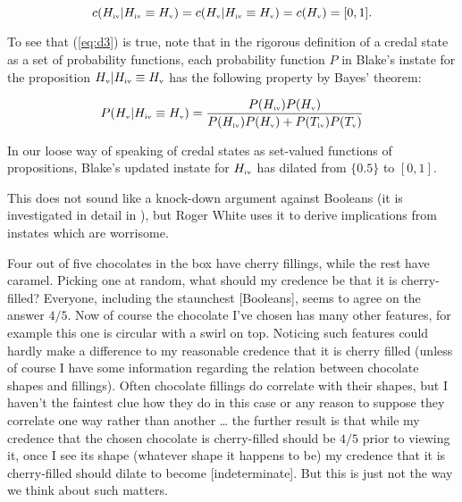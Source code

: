 \documentclass[11pt]{article}
\begin{document}
\begin{equation}
  \label{eq:d3}
  c(H_{\mbox{\tiny{iv}}}|H_{\mbox{\tiny{iv}}}\equiv{}H_{\mbox{\tiny{v}}})=c(H_{\mbox{\tiny{v}}}|H_{\mbox{\tiny{iv}}}\equiv{}H_{\mbox{\tiny{v}}})=c(H_{\mbox{\tiny{v}}})=[0,1].
\end{equation}

To see that (\ref{eq:d3}) is true, note that in the rigorous
definition of a credal state as a set of probability functions, each
probability function $P$ in Blake's instate for the proposition
$H_{\mbox{\tiny{v}}}|H_{\mbox{\tiny{iv}}}\equiv{}H_{\mbox{\tiny{v}}}$
has the following property by Bayes' theorem:

\begin{equation}
  \label{eq:zeibaefu}
  P(H_{\mbox{\tiny{v}}}|H_{\mbox{\tiny{iv}}}\equiv{}H_{\mbox{\tiny{v}}})=\frac{P(H_{\mbox{\tiny{iv}}})P(H_{\mbox{\tiny{v}}})}{P(H_{\mbox{\tiny{iv}}})P(H_{\mbox{\tiny{v}}})+P(T_{\mbox{\tiny{iv}}})P(T_{\mbox{\tiny{v}}})}
\end{equation}

In our loose way of speaking of credal states as set-valued functions
of propositions, Blake's updated instate for $H_{\mbox{\tiny{iv}}}$
has dilated from $\{0.5\}$ to $[0,1]$.

This does not sound like a knock-down argument against Booleans (it is
investigated in detail in ), but
Roger White uses it to derive implications from instates which are
worrisome.

\begin{quotex}
  \label{ex:chocolates} Four out of five
  chocolates in the box have cherry fillings, while the rest have
  caramel. Picking one at random, what should my credence be that it
  is cherry-filled? Everyone, including the staunchest [Booleans],
  seems to agree on the answer $4/5$. Now of course the chocolate I've
  chosen has many other features, for example this one is circular
  with a swirl on top. Noticing such features could hardly make a
  difference to my reasonable credence that it is cherry filled
  (unless of course I have some information regarding the relation
  between chocolate shapes and fillings). Often chocolate fillings do
  correlate with their shapes, but I haven't the faintest clue how
  they do in this case or any reason to suppose they correlate one way
  rather than another {\ldots} the further result is that while my
  credence that the chosen chocolate is cherry-filled should be $4/5$
  prior to viewing it, once I see its shape (whatever shape it happens
  to be) my credence that it is cherry-filled should dilate to become
  [indeterminate]. But this is just not the way we think about such
  matters. 
\end{quotex}
\end{document}
